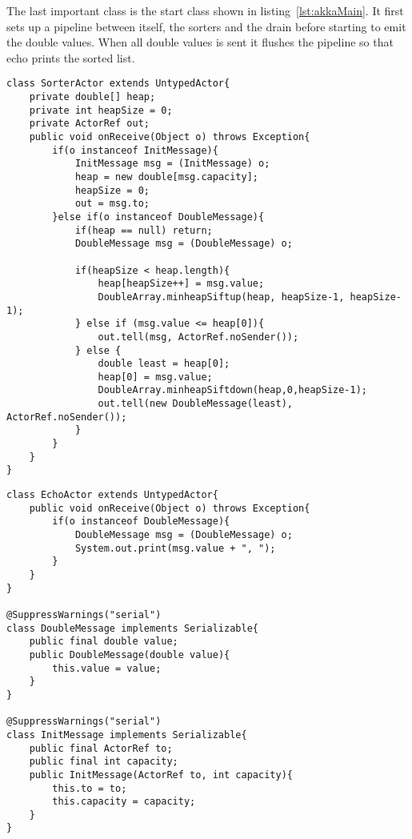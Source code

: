 \documentclass{ituhandin}
\begin{document}
The last important class is the start class shown in listing~\ref{lst:akkaMain}. It first sets up a pipeline between itself, the sorters and the drain before starting to emit the double values. When all double values is sent it flushes the pipeline so that echo prints the sorted list.
\begin{lstlisting}[caption=Sorting actor of \texttt{AkkeSortingPipeline},label={lst:akkasorter}]
class SorterActor extends UntypedActor{
    private double[] heap;
    private int heapSize = 0;
    private ActorRef out;
    public void onReceive(Object o) throws Exception{
        if(o instanceof InitMessage){
            InitMessage msg = (InitMessage) o; 
            heap = new double[msg.capacity];
            heapSize = 0;
            out = msg.to;
        }else if(o instanceof DoubleMessage){
            if(heap == null) return;
            DoubleMessage msg = (DoubleMessage) o;

            if(heapSize < heap.length){
                heap[heapSize++] = msg.value;
                DoubleArray.minheapSiftup(heap, heapSize-1, heapSize-1);
            } else if (msg.value <= heap[0]){
                out.tell(msg, ActorRef.noSender());
            } else {
                double least = heap[0];
                heap[0] = msg.value;
                DoubleArray.minheapSiftdown(heap,0,heapSize-1);
                out.tell(new DoubleMessage(least), ActorRef.noSender());
            } 
        }
    }
}
\end{lstlisting}
\begin{lstlisting}[caption=Messages and Echo actor of \texttt{AkkeSortingPipeline},label={lst:akkaecho}]
class EchoActor extends UntypedActor{
    public void onReceive(Object o) throws Exception{
        if(o instanceof DoubleMessage){
            DoubleMessage msg = (DoubleMessage) o;
            System.out.print(msg.value + ", ");
        }
    }
}

@SuppressWarnings("serial")
class DoubleMessage implements Serializable{
    public final double value;
    public DoubleMessage(double value){
        this.value = value;
    }
}

@SuppressWarnings("serial")
class InitMessage implements Serializable{
    public final ActorRef to;
    public final int capacity;
    public InitMessage(ActorRef to, int capacity){
        this.to = to;
        this.capacity = capacity;
    }
}
\end{lstlisting}
\end{document}
